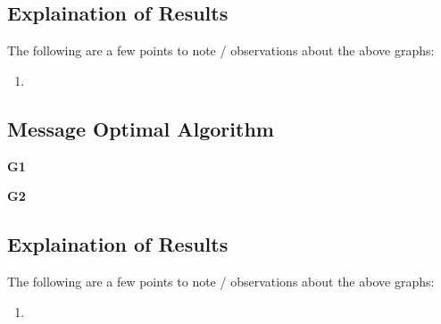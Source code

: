 \documentclass[a4paper,12pt]{report}
\begin{document}
\subsection{Explaination of Results}
The following are a few points to note / observations about the above graphs:
\begin{enumerate}
\item
\end{enumerate}
\newpage
\subsection{Message Optimal Algorithm}
\begin{center}
\begin{large}
\textbf{G1}\\
\end{large}
\end{center}
\begin{center}
\begin{large}
\textbf{G2}\\
\end{large}
\end{center}
\subsection{Explaination of Results}
The following are a few points to note / observations about the above graphs:
\begin{enumerate}
\item
\end{enumerate}
\end{document}
